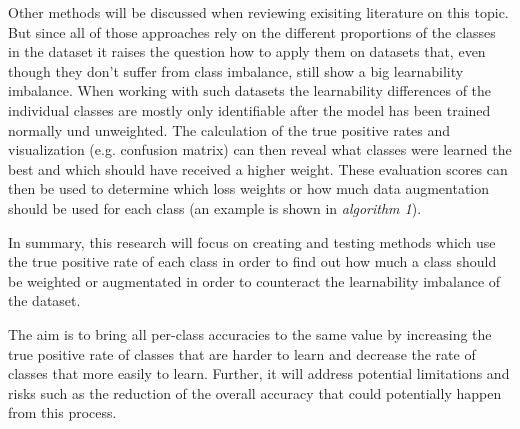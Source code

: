 \documentclass[journal]{IEEEtran}
\begin{document}
Other methods will be discussed when reviewing exisiting literature on this topic. 
But since all of those approaches rely on the different proportions of the classes in the dataset it raises the question how to apply them on datasets that, even though they don't suffer from class imbalance, still show a big learnability imbalance.
When working with such datasets the learnability differences of the individual classes are mostly only identifiable after the model has been trained normally und unweighted. %
The calculation of the true positive rates and visualization (e.g. confusion matrix) can then reveal what classes were learned the best and which should have received a higher weight.
These evaluation scores can then be used to determine which loss weights or how much data augmentation should be used for each class (an example is shown in \emph{algorithm 1}).

In summary, this research will focus on creating and testing methods which use the true positive rate of each class in order to find out how much a class should be weighted or augmentated in order to counteract the learnability imbalance of the dataset.

The aim is to bring all per-class accuracies to the same value by increasing the true positive rate of classes that are harder to learn 
and decrease the rate of classes that more easily to learn.
Further, it will address potential limitations and risks such as the reduction of the overall accuracy that could potentially happen from this process.
\end{document}
